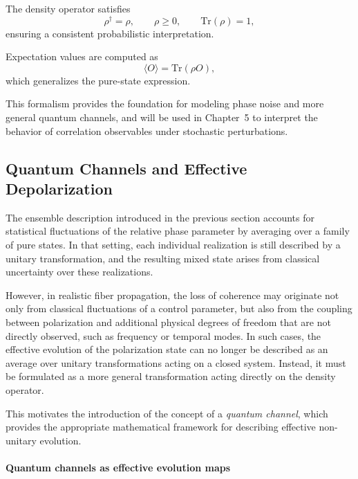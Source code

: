\documentclass[a4paper]{article}
\begin{document}
\medskip

The density operator satisfies
\[
\rho^\dagger = \rho, 
\qquad
\rho \ge 0, 
\qquad
\mathrm{Tr}(\rho) = 1,
\]
ensuring a consistent probabilistic interpretation.

\medskip

Expectation values are computed as
\[
\langle O \rangle = \mathrm{Tr}(\rho O),
\]
which generalizes the pure-state expression.

\medskip

This formalism provides the foundation for modeling phase noise and more general quantum channels, and will be used in Chapter~5 to interpret the behavior of correlation observables under stochastic perturbations.

\subsection{Quantum Channels and Effective Depolarization}

The ensemble description introduced in the previous section accounts for statistical fluctuations of the relative phase parameter by averaging over a family of pure states. In that setting, each individual realization is still described by a unitary transformation, and the resulting mixed state arises from classical uncertainty over these realizations.

However, in realistic fiber propagation, the loss of coherence may originate not only from classical fluctuations of a control parameter, but also from the coupling between polarization and additional physical degrees of freedom that are not directly observed, such as frequency or temporal modes. In such cases, the effective evolution of the polarization state can no longer be described as an average over unitary transformations acting on a closed system. Instead, it must be formulated as a more general transformation acting directly on the density operator.

\medskip

This motivates the introduction of the concept of a \emph{quantum channel}, which provides the appropriate mathematical framework for describing effective non-unitary evolution.

\paragraph{Quantum channels as effective evolution maps}
\end{document}
